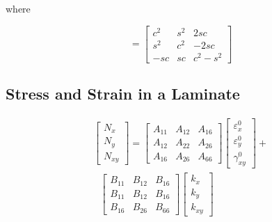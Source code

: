 \documentclass[Afour,sageh,times]{sagej}
\begin{document}
where 

\begin{equation}
	[T]=\left[\begin{array}{ccc}c^{2} & s^{2} & 2 s c \\ s^{2} & c^{2} & -2 s c \\ -s c & s c &
	c^{2}-s^{2}\end{array}\right] 
\end{equation}

\subsection{Stress and Strain in a Laminate}

\begin{equation} \label{eq:force_and_moments}
	\begin{array}{l}
	\begin{bmatrix}
		N_x \\
		N_y \\
		N_{xy}
	\end{bmatrix}
	=
	\begin{bmatrix}
		A_{11} & A_{12} & A_{16} \\
		A_{12} & A_{22} & A_{26} \\
		A_{16} & A_{26} & A_{66} 
	\end{bmatrix}
    \begin{bmatrix}
		\varepsilon_x^0 \\
        \varepsilon_y^0 \\
		\gamma_{xy}^0
    \end{bmatrix}  
	+ \\ \text{             }
	\begin{bmatrix}
		B_{11} & B_{12} & B_{16} \\
		B_{11} & B_{12} & B_{16} \\
		B_{16} & B_{26} & B_{66} 
	\end{bmatrix}
	\begin{bmatrix}
		k_x \\
		k_y \\
		k_{xy} 
	\end{bmatrix}  \\
	\\


\end{array}
\end{equation}
\end{document}
